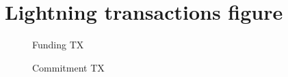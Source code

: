 \section{Lightning transactions figure}
  \begin{figure}
  \begin{minipage}{0.5\textwidth}
  \label{fig:ln:funding}
  \caption{Funding TX}
  \end{minipage}
  \hfill
  \begin{minipage}{0.5\textwidth}
  \label{fig:ln:commitment}
  \caption{Commitment TX}
  \end{minipage}
  \end{figure}
